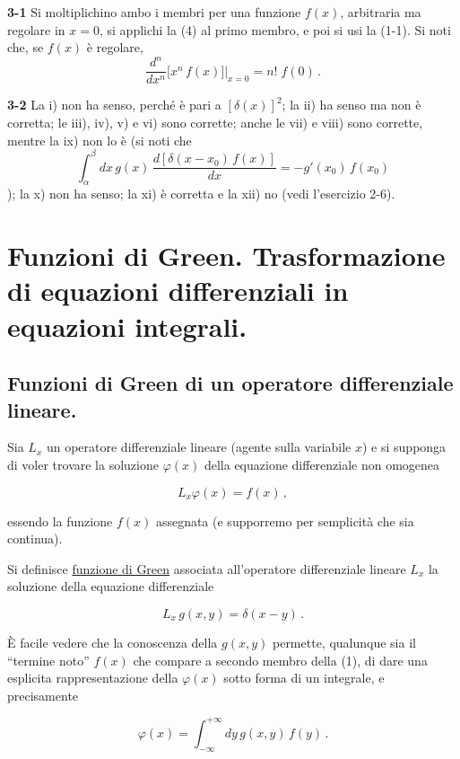 \documentclass[11pt, a4paper]{book}
\numberwithin{equation}{section}
\begin{document}
\textbf{3-1} \quad Si moltiplichino ambo i membri per una funzione $f(x)$, arbitraria ma regolare in $x=0$, si applichi la (4) al primo membro, e poi si usi la (1-1). Si noti che, se $f(x)$ è regolare,
\[
\frac{d^n}{dx^n}\bigl[x^n\, f(x)\bigr]\bigg|_{x=0} = n!\; f(0) \,.
\]

\textbf{3-2} \quad La i) non ha senso, perché è pari a $[\delta(x)]^2$; la ii) ha senso ma non è corretta; le iii), iv), v) e vi) sono corrette; anche le vii) e viii) sono corrette, mentre la ix) non lo è (si noti che
\[
\int_{\alpha}^{\beta} dx\, g(x)\, \frac{d[\delta(x-x_0)\, f(x)]}{dx} = -g'(x_0)\, f(x_0)
\]
); la x) non ha senso; la xi) è corretta e la xii) no (vedi l'esercizio 2-6).

\chapter{Funzioni di Green. Trasformazione di equazioni differenziali in equazioni integrali.}

\section{Funzioni di Green di un operatore differenziale lineare.}

Sia $L_x$ un operatore differenziale lineare (agente sulla variabile $x$) e si supponga di voler trovare la soluzione $\varphi(x)$ della equazione differenziale non omogenea

\begin{equation}
    L_x \varphi(x) = f(x) \,,
\end{equation}

essendo la funzione $f(x)$ assegnata (e supporremo per semplicità che sia continua).

Si definisce \underline{funzione di Green} associata all'operatore differenziale lineare $L_x$ la soluzione della equazione differenziale

\begin{equation}
    L_x \, g(x,y) = \delta(x-y) \,.
\end{equation}

È facile vedere che la conoscenza della $g(x,y)$ permette, qualunque sia il ``termine noto'' $f(x)$ che compare a secondo membro della (1), di dare una esplicita rappresentazione della $\varphi(x)$ sotto forma di un integrale, e precisamente

\begin{equation}
    \varphi(x) = \int_{-\infty}^{+\infty} dy \, g(x,y) \, f(y) \,.
\end{equation}
\end{document}
